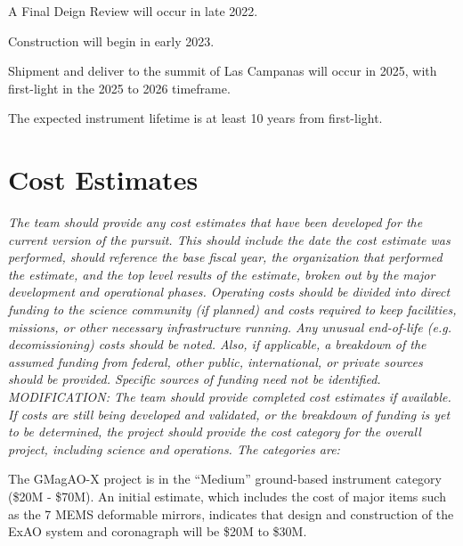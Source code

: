 \documentclass[12pt,preprint]{aastex}
\begin{document}
A Final Deign Review will occur in late 2022.

Construction will begin in early 2023.

Shipment and deliver to the summit of Las Campanas will occur in 2025, with first-light in the 2025 to 2026 timeframe.

The expected instrument lifetime is at least 10 years from first-light.  

\section{Cost Estimates}
\textit{The team should provide any cost estimates that have been developed for the
current version of the pursuit. This should include the date the cost estimate was performed,
should reference the base fiscal year, the organization that performed the estimate, and the top
level results of the estimate, broken out by the major development and operational phases.
Operating costs should be divided into direct funding to the science community (if planned) and
costs required to keep facilities, missions, or other necessary infrastructure running. Any
unusual end-of-life (e.g. decomissioning) costs should be noted. Also, if applicable, a
breakdown of the assumed funding from federal, other public, international, or private sources
should be provided. Specific sources of funding need not be identified.
MODIFICATION: The team should provide completed cost estimates if available. If costs are
still being developed and validated, or the breakdown of funding is yet to be determined, the
project should provide the cost category for the overall project, including science and
operations. The categories are:}

The GMagAO-X project is in the ``Medium'' ground-based instrument category (\$20M - \$70M).  An initial estimate, which includes the cost of major items such as the 7 MEMS deformable mirrors, indicates that design and construction of the ExAO system and coronagraph will be \$20M to \$30M.   



\clearpage
\thispagestyle{empty}
\end{document}
